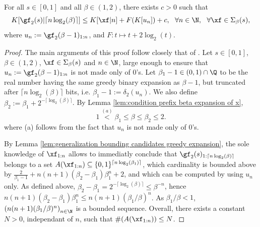 \begin{theorem}\label{lemma:generalized app beta expansions are more complex than the binary expansion}
	For all $s \in [0,1]$ and all $\beta \in (1,2)$, there exists $c > 0$ such that
\begin{equation}
	K[\gf_2(s)|\lceil n \log_2(\beta)\rceil] \leq K[\xf|n] + F(K[u_n]) + c, \ \ \forall n \in \N, \ \ \forall \xf \in \Sigma_\beta(s),
\end{equation}
where $u_n := \gf_2(\beta-1)_{1: n}$, and $F: t \mapsto t + 2\log_2(t)$.
\end{theorem}
\begin{proof}
The main arguments of this proof follow closely that of \cite[Theorem 3]{staiger2002kolmogorov}. Let $s \in [0,1]$, $\beta \in (1,2)$, $\xf \in \Sigma_\beta(s)$ and $n \in \N$, large enough to ensure that $u_n := \gf_2(\beta - 1)_{1: n}$ is not made only of $0$'s. Let $\beta_1 - 1 \in (0,1)\cap \Q$ to be the real number having the same greedy binary expansion as $\beta - 1$, but truncated after $\lceil n \log_2(\beta)\rceil$ bits, i.e. $\beta_1 - 1 := \delta_2(u_n)$.
We also define $\beta_2 := \beta_1 + 2^{-\lceil \log_2(\beta)\rceil}$. By Lemma \ref{lem:condition prefix beta expansion of x}, 
\begin{equation}
	1 \overset{(a)}{<} \beta_1 \leq \beta \leq \beta_2 \leq 2.
\end{equation}
where (a) follows from the fact that $u_n$ is not made only of $0$'s.

By Lemma \ref{lem:generalization bounding candidates greedy expansion}, the sole knowledge of $\xf_{1: n}$ allows to immediatly conclude that $\gf_2(s)_{1: \lceil n \log_2(\beta) \rceil}$ belongs to a set $A(\xf_{1: n}) \subseteq \{0,1\}^{\lceil n \log_2(\beta_1) \rceil}$, which cardinality is bounded above by $\frac{2}{\beta_1 - 1} + n(n+1)(\beta_2 - \beta_1)\beta_1^{n} + 2$, and which can be computed by using $u_n$ only. As defined above, $\beta_2 - \beta_1 = 2^{-\lceil \log_2(\beta)\rceil} \leq \beta^{-n}$, hence $n(n+1)(\beta_2 - \beta_1)\beta_1^n \leq n(n+1) (\beta_1/\beta)^n$. As $\beta_1/\beta < 1$, $\left(n(n+1) (\beta_1/\beta)^n\right)_{n \in \N}$ is a bounded sequence. Overall, there exists a constant $N > 0$, independant of $n$, such that $\#(A(\xf_{1: n})) \leq N$.


\end{proof}
